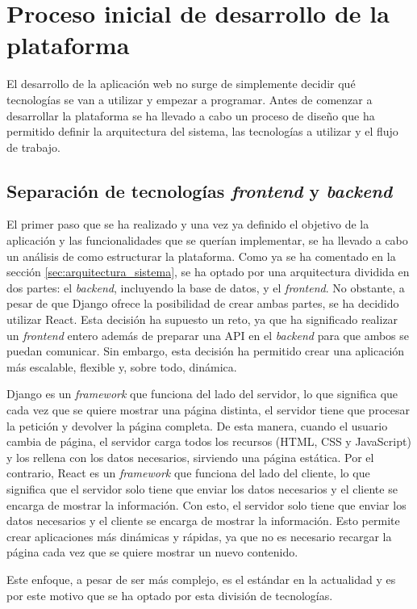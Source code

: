 \section{Proceso inicial de desarrollo de la plataforma}
\label{sec:proceso_desarrollo}

El desarrollo de la aplicación web no surge de simplemente decidir qué tecnologías se van a utilizar y empezar a programar. Antes de comenzar a desarrollar la plataforma se ha llevado a cabo un proceso de diseño que ha permitido definir la arquitectura del sistema, las tecnologías a utilizar y el flujo de trabajo.

\subsection{Separación de tecnologías \textit{frontend} y \textit{backend}}
\label{dev:subsec:separacion_frontend_backend}

El primer paso que se ha realizado y una vez ya definido el objetivo de la aplicación y las funcionalidades que se querían implementar, se ha llevado a cabo un análisis de como estructurar la plataforma. Como ya se ha comentado en la sección \ref{sec:arquitectura_sistema}, se ha optado por una arquitectura dividida en dos partes: el \textit{backend}, incluyendo la base de datos, y el \textit{frontend}. No obstante, a pesar de que Django ofrece la posibilidad de crear ambas partes, se ha decidido utilizar React. Esta decisión ha supuesto un reto, ya que ha significado realizar un \textit{frontend} entero además de preparar una API en el \textit{backend} para que ambos se puedan comunicar. Sin embargo, esta decisión ha permitido crear una aplicación más escalable, flexible y, sobre todo, dinámica.

Django es un \textit{framework} que funciona del lado del servidor, lo que significa que cada vez que se quiere mostrar una página distinta, el servidor tiene que procesar la petición y devolver la página completa. De esta manera, cuando el usuario cambia de página, el servidor carga todos los recursos (HTML, CSS y JavaScript) y los rellena con los datos necesarios, sirviendo una página estática. Por el contrario, React es un \textit{framework} que funciona del lado del cliente, lo que significa que el servidor solo tiene que enviar los datos necesarios y el cliente se encarga de mostrar la información. Con esto, el servidor solo tiene que enviar los datos necesarios y el cliente se encarga de mostrar la información. Esto permite crear aplicaciones más dinámicas y rápidas, ya que no es necesario recargar la página cada vez que se quiere mostrar un nuevo contenido.

Este enfoque, a pesar de ser más complejo, es el estándar en la actualidad y es por este motivo que se ha optado por esta división de tecnologías.